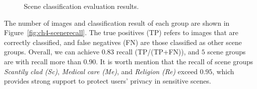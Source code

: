 \begin{figure}[!htbp]

\caption{Scene classification evaluation results.}
\label{fig:ch4-sceneeval}
\end{figure}

The number of images and classification result of each group are shown in Figure~\ref{fig:ch4-scenerecall}. The true positives (TP) refers to images that are correctly classified, and false negatives (FN) are those classified as other scene groups. Overall, we can achieve {$0.83$} recall (TP/(TP+FN)), and $5$ scene groups are with recall more than $0.90$. It is worth mention that the recall of scene groups \textit{Scantily clad (Sc)}, \textit{Medical care (Me)}, and \textit{Religion (Re)} exceed $0.95$, which provides strong support to protect users' privacy in sensitive scenes.

